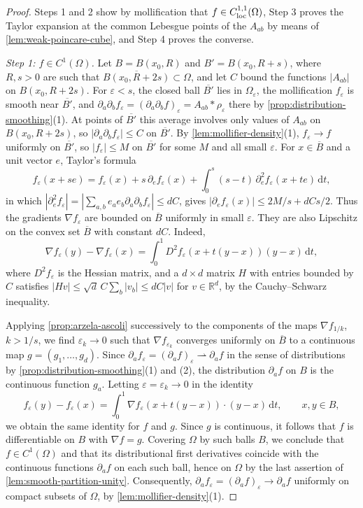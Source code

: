 \begin{proof}
Steps 1 and 2 show by mollification that $f\in C^{1,1}_{\mathrm{loc}}(\Omega)$, Step 3 proves the Taylor expansion at the common Lebesgue points of the $A_{ab}$ by means of \cref{lem:weak-poincare-cube}, and Step 4 proves the converse.

\emph{Step 1: $f\in C^1(\Omega)$.} Let $B=B(x_0,R)$ and $B'=B(x_0,R+s)$, where $R,s>0$ are such that $\overline{B(x_0,R+2s)}\subset\Omega$, and let $C$ bound the functions $|A_{ab}|$ on $B(x_0,R+2s)$. For $\varepsilon<s$, the closed ball $\overline{B'}$ lies in $\Omega_\varepsilon$, the mollification $f_\varepsilon$ is smooth near $\overline{B'}$, and $\partial_a\partial_bf_\varepsilon=(\partial_a\partial_bf)_\varepsilon=A_{ab}*\rho_\varepsilon$ there by \cref{prop:distribution-smoothing}(1). At points of $\overline{B'}$ this average involves only values of $A_{ab}$ on $B(x_0,R+2s)$, so $|\partial_a\partial_bf_\varepsilon|\leq C$ on $\overline{B'}$. By \cref{lem:mollifier-density}(1), $f_\varepsilon\to f$ uniformly on $\overline{B'}$, so $|f_\varepsilon|\leq M$ on $\overline{B'}$ for some $M$ and all small $\varepsilon$. For $x\in\overline B$ and a unit vector $e$, Taylor's formula
\[
 f_\varepsilon(x+se)=f_\varepsilon(x)+s\,\partial_ef_\varepsilon(x)+\int_0^s(s-t)\,\partial_e^2f_\varepsilon(x+te)\,\mathrm dt,
\]
in which $|\partial_e^2f_\varepsilon|=|\sum_{a,b}e_ae_b\partial_a\partial_bf_\varepsilon|\leq dC$, gives $|\partial_ef_\varepsilon(x)|\leq2M/s+dCs/2$. Thus the gradients $\nabla f_\varepsilon$ are bounded on $\overline B$ uniformly in small $\varepsilon$. They are also Lipschitz on the convex set $\overline B$ with constant $dC$. Indeed,
\[
 \nabla f_\varepsilon(y)-\nabla f_\varepsilon(x)=\int_0^1D^2f_\varepsilon(x+t(y-x))(y-x)\,\mathrm dt,
\]
where $D^2f_\varepsilon$ is the Hessian matrix, and a $d\times d$ matrix $H$ with entries bounded by $C$ satisfies $|Hv|\leq\sqrt d\,C\sum_b|v_b|\leq dC|v|$ for $v\in\mathbb R^d$, by the Cauchy--Schwarz inequality.

Applying \cref{prop:arzela-ascoli} successively to the components of the maps $\nabla f_{1/k}$, $k>1/s$, we find $\varepsilon_k\to0$ such that $\nabla f_{\varepsilon_k}$ converges uniformly on $\overline B$ to a continuous map $g=(g_1,\ldots,g_d)$. Since $\partial_af_\varepsilon=(\partial_af)_\varepsilon\rightharpoonup\partial_af$ in the sense of distributions by \cref{prop:distribution-smoothing}(1) and (2), the distribution $\partial_af$ on $B$ is the continuous function $g_a$. Letting $\varepsilon=\varepsilon_k\to0$ in the identity
\[
 f_\varepsilon(y)-f_\varepsilon(x)=\int_0^1\nabla f_\varepsilon(x+t(y-x))\cdot(y-x)\,\mathrm dt,\qquad x,y\in B,
\]
we obtain the same identity for $f$ and $g$. Since $g$ is continuous, it follows that $f$ is differentiable on $B$ with $\nabla f=g$. Covering $\Omega$ by such balls $B$, we conclude that $f\in C^1(\Omega)$ and that its distributional first derivatives coincide with the continuous functions $\partial_af$ on each such ball, hence on $\Omega$ by the last assertion of \cref{lem:smooth-partition-unity}. Consequently, $\partial_af_\varepsilon=(\partial_af)_\varepsilon\to\partial_af$ uniformly on compact subsets of $\Omega$, by \cref{lem:mollifier-density}(1).


\end{proof}
